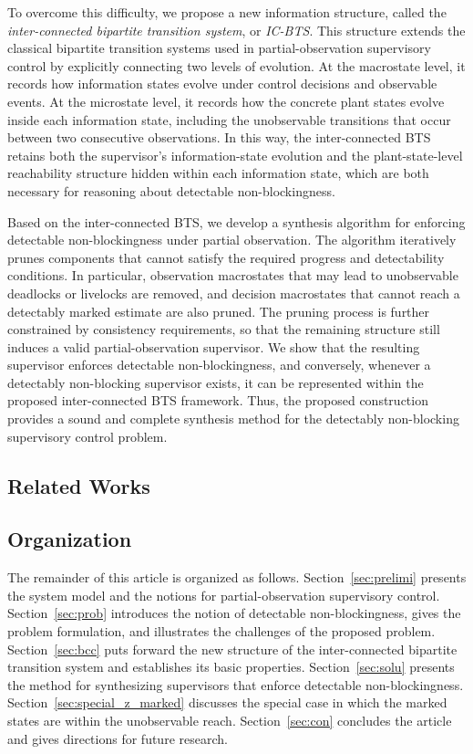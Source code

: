 \documentclass[twocolumn]{autart}
\begin{document}
To overcome this difficulty, we propose a new information structure, called the \emph{inter-connected bipartite transition system}, or \emph{IC-BTS}.
This structure extends the classical bipartite transition systems used in partial-observation supervisory control by explicitly connecting two levels of evolution.
At the macrostate level, it records how information states evolve under control decisions and observable events.
At the microstate level, it records how the concrete plant states evolve inside each information state, including the unobservable transitions that occur between two consecutive observations.
In this way, the inter-connected BTS retains both the supervisor's information-state evolution and the plant-state-level reachability structure hidden within each information state, which are both necessary for reasoning about detectable non-blockingness.

Based on the inter-connected BTS, we develop a synthesis algorithm for enforcing detectable non-blockingness under partial observation. The algorithm iteratively prunes components that cannot satisfy the required progress and detectability conditions. In particular, observation macrostates that may lead to unobservable deadlocks or livelocks are removed, and decision macrostates that cannot reach a detectably marked estimate are also pruned.
The pruning process is further constrained by consistency requirements, so that the remaining structure still induces a valid partial-observation supervisor.
We show that the resulting supervisor enforces detectable non-blockingness, and conversely, whenever a detectably non-blocking supervisor exists, it can be represented within the proposed inter-connected BTS framework.
Thus, the proposed construction provides a sound and complete synthesis method for the detectably non-blocking supervisory control problem.

\subsection{Related Works}  

\subsection{Organization}

The remainder of this article is organized as follows.
%
Section~\ref{sec:prelimi} presents the system model and the notions for partial-observation supervisory control.
Section~\ref{sec:prob} introduces the notion of detectable non-blockingness, gives the problem formulation, and illustrates the challenges of the proposed problem.
Section~\ref{sec:bcc} puts forward the new structure of the inter-connected bipartite transition system and establishes its basic properties.
Section~\ref{sec:solu} presents the method for synthesizing supervisors that enforce detectable non-blockingness.
Section~\ref{sec:special_z_marked} discusses the special case in which the marked states are within the unobservable reach.
Section~\ref{sec:con} concludes the article and gives directions for future research.
 
\end{document}

